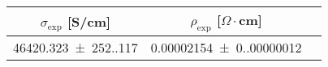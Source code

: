 \begin{tabular}{ccc}
\toprule
$\sigma_{\exp}$ [S/cm] & $\rho_{\exp}$ [$\Omega  \cdot$cm] \\
\midrule
\num{46420.323(252.117)} & \num{0.00002154(0.00000012)} \\
\bottomrule
\end{tabular}

